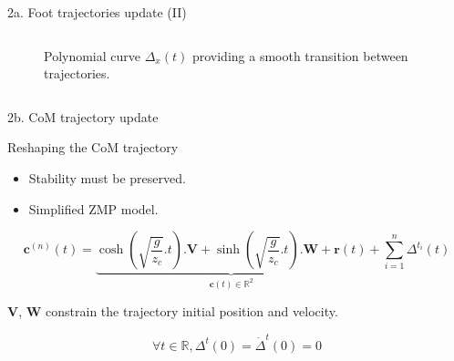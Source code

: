 \documentclass[hyperref={pdfpagelabels=false}]{beamer}
\begin{document}
\begin{frame}{2a. Foot trajectories update (II)}
\begin{columns}[c]
\begin{column}{0.5\textwidth}
\begin{figure}[ht!]
\begin{center}
  \end{center}
  \caption{Polynomial curve $\Delta_{x}(t)$ providing a smooth
    transition between trajectories. \label{fig:transition}}
\end{figure}

    \end{column}
   \end{columns}

\end{frame}

\begin{frame}{2b. CoM trajectory update}

      \begin{block}{Reshaping the CoM trajectory}
        \begin{itemize}
          \item Stability must be preserved.
          \item Simplified ZMP model.\\
            \footnotesize
            \cite{11icra.perrin}
        \end{itemize}

        \begin{equation} \label{eq:zmpsolcor}
          \mathbf{c}^{(n)}(t) =
          \underbrace{\scriptstyle \cosh(\sqrt{\frac{g}{z_c}}.t) . \mathbf{V} +
            \sinh(\sqrt{\frac{g}{z_c}}.t) . \mathbf{W} +
            \mathbf{r}(t)}_{\mathbf{c}(t) \in \mathbb{R}^2} + \sum_{i=1}^n \Delta^{t_i}(t)
        \end{equation}

        \begin{center}
          $\mathbf{V}$, $\mathbf{W}$ constrain the trajectory initial
          position and velocity.
        \end{center}

        \begin{equation}
          \forall t \in \mathbb{R}, \Delta^t(0) = \dot{\Delta}^t(0) = 0
        \end{equation}
      \end{block}
\end{frame}
\end{document}
